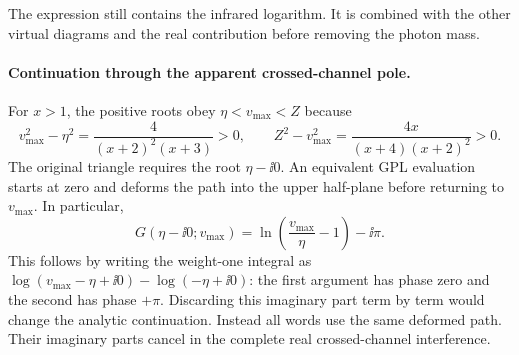The expression still contains the infrared logarithm. It is combined
with the other virtual diagrams and the real contribution before
removing the photon mass.

\paragraph{Continuation through the apparent crossed-channel pole.}
For $x>1$, the positive roots obey $\eta<v_{\max}<Z$ because
\begin{equation}
 v_{\max}^2-\eta^2=\frac4{(x+2)^2(x+3)}>0,\qquad
 Z^2-v_{\max}^2=\frac{4x}{(x+4)(x+2)^2}>0.
\end{equation}
The original triangle requires the root $\eta-\ii0$.
An equivalent GPL evaluation starts at zero and deforms the path
into the upper half-plane before returning to $v_{\max}$.
In particular,
\begin{equation}
 G(\eta-\ii0;v_{\max})
 =\ln\!\left(\frac{v_{\max}}\eta-1\right)-\ii\pi.
\end{equation}
This follows by writing the weight-one integral as
$\log(v_{\max}-\eta+\ii0)-\log(-\eta+\ii0)$: the
first argument has phase zero and the second has phase $+\pi$.
Discarding this imaginary part term by term would change the
analytic continuation. Instead all words use the same deformed
path. Their imaginary parts cancel in the complete real
crossed-channel interference.
